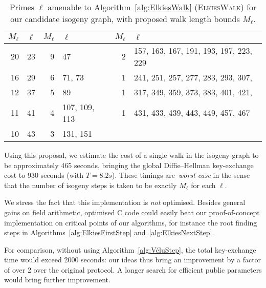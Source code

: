 \documentclass{llncs}
\newcommand{\algstyle}[1]{\textsc{#1}}
\begin{document}
\begin{table}
    \centering
    \begin{tabular}{r@{\;}|@{\;}l@{\;}||@{\;}r@{\;}|@{\;}l@{\;}||@{\;}r@{\;}|@{\;}l@{\;}}
        $M_\ell$ & $\ell$
        &
        $M_\ell$ & $\ell$
        &
        $M_\ell$ & $\ell$
        \\
        \hline
        20 & 23
        &
        9  & 47
        &
        2  & 157, 163, 167, 191, 193, 197, 223, 229
        \\
        16 & 29
        &
        6  & 71, 73
        &
        1  & 241, 251, 257, 277, 283, 293, 307,
        \\
        12 & 37
        &
        5  & 89
        &
        1  & 317, 349, 359, 373, 383, 401, 421,
        \\
        11 & 41
        &
        4  & 107, 109, 113
        &
        1  & 431, 433, 439, 443, 449, 457, 467
        \\
        10 & 43
        &
        3  & 131, 151
        &
        \\
        \hline
    \end{tabular}
    \smallskip
    \caption{Primes $\ell$ amenable to 
        Algorithm~\ref{alg:ElkiesWalk} (\algstyle{ElkiesWalk})
        for our candidate isogeny graph, 
        with proposed walk length bounds $M_\ell$.}
    \label{tab:ElkiesSteps}
\end{table}

Using this proposal, we estimate the cost of a single walk in the
isogeny graph to be approximately 465 seconds, bringing the global
Diffie--Hellman key-exchange cost to 930 seconds (with $T = 8.2s$).
These timings are~\emph{worst-case}
in the sense that the number of isogeny steps is taken
to be exactly $M_\ell$ for each $\ell$.

We stress the fact that this implementation
is \emph{not} optimised. Besides general gains on field arithmetic,
optimised C code could easily beat our proof-of-concept implementation
on critical points of our algorithms, for instance the root finding steps 
in Algorithms~\ref{alg:ElkiesFirstStep}
and~\ref{alg:ElkiesNextStep}.

For comparison, without using Algorithm~\ref{alg:VéluStep}, the
total key-exchange time would exceed 2000 seconds:
our ideas thus bring an improvement by a factor of over 2 over the
original protocol. A longer search for efficient public
parameters would bring further improvement.
\end{document}
